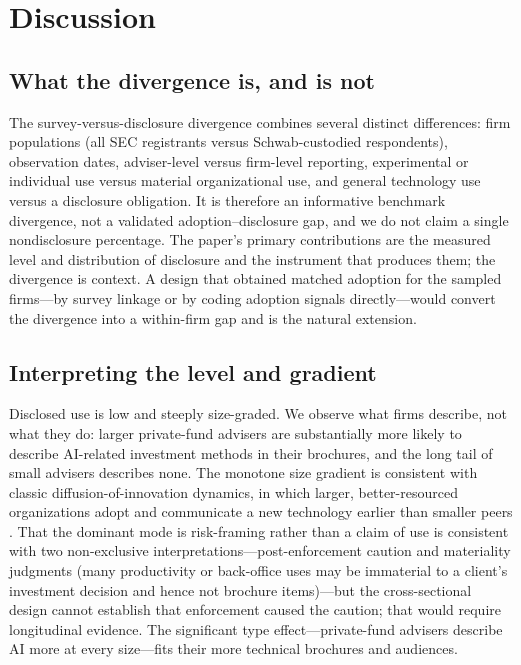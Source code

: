 \documentclass[utf8]{FrontiersinHarvard}
\begin{document}
\section{Discussion}

\subsection{What the divergence is, and is not}
The survey-versus-disclosure divergence combines several distinct differences: firm populations (all SEC registrants versus Schwab-custodied respondents), observation dates, adviser-level versus firm-level reporting, experimental or individual use versus material organizational use, and general technology use versus a disclosure obligation. It is therefore an informative benchmark divergence, not a validated adoption--disclosure gap, and we do not claim a single nondisclosure percentage. The paper's primary contributions are the measured level and distribution of disclosure and the instrument that produces them; the divergence is context. A design that obtained matched adoption for the sampled firms---by survey linkage or by coding adoption signals directly---would convert the divergence into a within-firm gap and is the natural extension.

\subsection{Interpreting the level and gradient}
Disclosed use is low and steeply size-graded. We observe what firms describe, not what they do: larger private-fund advisers are substantially more likely to describe AI-related investment methods in their brochures, and the long tail of small advisers describes none. The monotone size gradient is consistent with classic diffusion-of-innovation dynamics, in which larger, better-resourced organizations adopt and communicate a new technology earlier than smaller peers \citep{rogers2003}. That the dominant mode is risk-framing rather than a claim of use is consistent with two non-exclusive interpretations---post-enforcement caution and materiality judgments (many productivity or back-office uses may be immaterial to a client's investment decision and hence not brochure items)---but the cross-sectional design cannot establish that enforcement caused the caution; that would require longitudinal evidence. The significant type effect---private-fund advisers describe AI more at every size---fits their more technical brochures and audiences.
\end{document}
